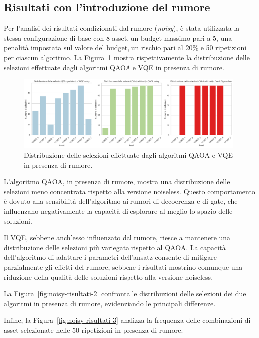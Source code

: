 \subsection{Risultati con l'introduzione del rumore}

Per l'analisi dei risultati condizionati dal rumore (\textit{noisy}), 
è stata utilizzata la stessa configurazione 
di base con 8 asset, un budget massimo pari a 5, una penalità impostata sul valore 
del budget, un rischio pari al 20\% e 50 ripetizioni per ciascun algoritmo. 
La Figura~\ref{fig:noisy-risultati-1} mostra rispettivamente la distribuzione 
delle selezioni effettuate dagli algoritmi QAOA e VQE in presenza di rumore.

\begin{figure}[ht!]
    \centering
    \includegraphics[width=0.99\textwidth]{images/risultati/noisy-risultati-1.png}
    \caption{Distribuzione delle selezioni effettuate dagli algoritmi QAOA e VQE in presenza di rumore.}
    \label{fig:noisy-risultati-1}
\end{figure}

L'algoritmo QAOA, in presenza di rumore, mostra una distribuzione delle selezioni 
meno concentrata rispetto alla versione noiseless. Questo comportamento 
è dovuto alla sensibilità dell'algoritmo ai rumori di decoerenza e di gate, 
che influenzano negativamente la capacità di esplorare al meglio lo spazio 
delle soluzioni. 

Il VQE, sebbene anch'esso influenzato dal rumore, riesce a mantenere una 
distribuzione delle selezioni più variegata rispetto al QAOA. La capacità 
dell'algoritmo di adattare i parametri dell'ansatz consente di mitigare 
parzialmente gli effetti del rumore, sebbene i risultati mostrino comunque 
una riduzione della qualità delle soluzioni rispetto alla versione noiseless.

La Figura~\ref{fig:noisy-risultati-2} confronta le distribuzioni delle selezioni 
dei due algoritmi in presenza di rumore, evidenziando le principali differenze. 

Infine, la Figura~\ref{fig:noisy-risultati-3} analizza la frequenza delle combinazioni 
di asset selezionate nelle 50 ripetizioni in presenza di rumore.

